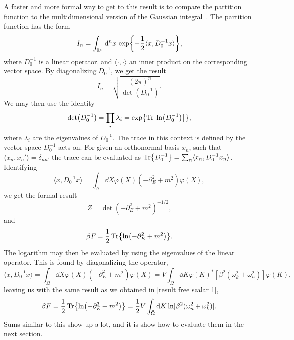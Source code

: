 A faster and more formal way to get to this result is to compare the partition function to the multidimensional version of the Gaussian integral~\cite{Kapusta:finiteTemp, Peskin:IntroQFT}.
The partition function has the form 
\begin{equation*}
    I_n = \int_{\mathbb{R}^n} \dd^n x\, \exp{- \frac{1}{2} \langle x, D_0^{-1} x\rangle },
\end{equation*}
where $D_0^{-1}$ is a linear operator, and $\langle \cdot , \cdot \rangle$ an inner product on the corresponding vector space.
By diagonalizing $D_0^{-1}$, we get the result
\begin{equation*}
    I_n = \sqrt{\frac{(2 \pi)^n}{\det(D_0^{-1})}}.
\end{equation*}
We may then use the identity
\begin{equation}
    \label{lndettrln}
    \det(D_0^{-1}) = \prod_i \lambda_i = \exp{\Tr[\ln(D_0^{-1})]},
\end{equation}
where $\lambda_i$ are the eigenvalues of $D_0^{-1}$.
The trace in this context is defined by the vector space $D_0^{-1}$ acts on.
For given an orthonormal basis $x_n$, such that $\langle x_n, x_n'\rangle = \delta_{nn'}$ the trace can be evaluated as $\Tr{D_0^{-1}} = \sum_n \langle x_n, D_0^{-1} x_n \rangle$.
Identifying 
\begin{equation*}
    \langle x, D_0^{-1} x\rangle = \int_\Omega \dd X \varphi(X)\left(-\partial_E^2+m^2\right)\varphi(X),
\end{equation*}
we get the formal result
\begin{equation*}
    Z = \det(-\partial_E^2 + m^2)^{-1/2},
\end{equation*}
and 
\begin{equation*}
    \beta F = \frac{1}{2}\Tr{\ln(-\partial_E^2 + m^2)}.
\end{equation*}
The logarithm may then be evaluated by using the eigenvalues of the linear operator.
This is found by diagonalizing the operator,
\begin{equation*}
    \langle x, D_0^{-1} x \rangle 
    = \int_\Omega \dd X \varphi(X)\left(-\partial_E^2+m^2\right)\varphi(X)
    = V  \int_{\tilde \Omega} \dd K 
    \tilde \varphi(K)^* [\beta^2(\omega_k^2 +\omega_n^2)] \tilde \varphi(K),
\end{equation*}
leaving us with the same result as we obtained in \autoref{result free scalar 1},
\begin{equation*}
    \beta F 
    = \frac{1}{2} \Tr{\ln(-\partial_E^2 + m^2)} 
    = \frac{1}{2} V \int_{\tilde \Omega} \dd K \ln[\beta^2(\omega_n^2 + \omega_k^2)].
\end{equation*}
Sums similar to this show up a lot, and it is show how to evaluate them in the next section.

